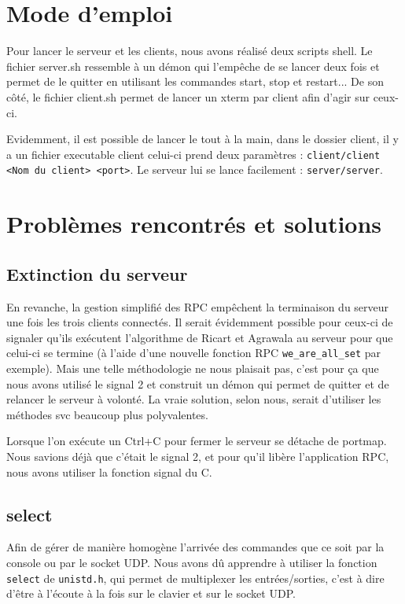 \section{Mode d'emploi}

Pour lancer le serveur et les clients, nous avons réalisé deux scripts shell. Le fichier server.sh ressemble à un démon qui l'empêche de se lancer deux fois et permet de le quitter en utilisant les commandes start, stop et restart... De son côté, le fichier client.sh permet de lancer un xterm par client afin d'agir sur ceux-ci.

Evidemment, il est possible de lancer le tout à la main, dans le dossier client, il y a un fichier executable client celui-ci prend deux paramètres :
\verb|client/client <Nom du client> <port>|. Le serveur lui se lance facilement : \verb|server/server|.

\section{Problèmes rencontrés et solutions}
\subsection{Extinction du serveur}

En revanche, la gestion simplifié des RPC empêchent la terminaison du serveur une fois les trois clients connectés. Il serait évidemment possible pour ceux-ci de signaler qu'ils exécutent l'algorithme de Ricart et Agrawala au serveur pour que celui-ci se termine (à l'aide d'une nouvelle fonction RPC \verb|we_are_all_set| par exemple). Mais une telle méthodologie ne nous plaisait pas, c'est pour ça que nous avons utilisé le signal 2 et construit un démon qui permet de quitter et de relancer le serveur à volonté. La vraie solution, selon nous, serait d'utiliser les méthodes svc beaucoup plus polyvalentes.

Lorsque l'on exécute un Ctrl+C pour fermer le serveur se détache de portmap. Nous savions déjà que c'était le signal 2, et pour qu'il libère l'application RPC, nous avons utiliser la fonction signal du C.

\subsection{select}

Afin de gérer de manière homogène l'arrivée des commandes que ce soit par la console ou par le socket UDP. Nous avons dû apprendre à utiliser la fonction \verb|select| de \verb|unistd.h|, qui permet de multiplexer les entrées/sorties, c'est à dire d'être à l'écoute à la fois sur le clavier et sur le socket UDP.

